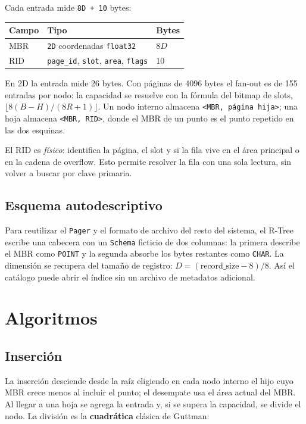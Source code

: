 \documentclass[11pt,a4paper]{article}
\newcommand{\code}[1]{\texttt{#1}}
\begin{document}
Cada entrada mide \code{8D + 10} bytes:

\begin{center}
\begin{tabular}{lll}
\hline
Campo & Tipo & Bytes \\
\hline
MBR & \code{2D} coordenadas \code{float32} & \(8D\) \\
RID & \code{page\_id}, \code{slot}, \code{area}, \code{flags} & 10 \\
\hline
\end{tabular}
\end{center}

En 2D la entrada mide 26 bytes. Con páginas de 4096 bytes el fan-out es de 155
entradas por nodo: la capacidad se resuelve con la fórmula del bitmap de slots,
\(\lfloor 8(B-H)/(8R+1) \rfloor\). Un nodo interno almacena
\code{<MBR, página hija>}; una hoja almacena \code{<MBR, RID>}, donde el MBR de
un punto es el punto repetido en las dos esquinas.

El RID es \emph{físico}: identifica la página, el slot y si la fila vive en el
área principal o en la cadena de overflow. Esto permite resolver la fila con una
sola lectura, sin volver a buscar por clave primaria.

\subsection{Esquema autodescriptivo}

Para reutilizar el \code{Pager} y el formato de archivo del resto del sistema,
el R-Tree escribe una cabecera con un \code{Schema} ficticio de dos columnas:
la primera describe el MBR como \code{POINT} y la segunda absorbe los bytes
restantes como \code{CHAR}. La dimensión se recupera del tamaño de registro:
\(D = (\text{record\_size} - 8) / 8\). Así el catálogo puede abrir el índice sin
un archivo de metadatos adicional.

\section{Algoritmos}

\subsection{Inserción}

La inserción desciende desde la raíz eligiendo en cada nodo interno el hijo cuyo
MBR crece menos al incluir el punto; el desempate usa el área actual del MBR.
Al llegar a una hoja se agrega la entrada y, si se supera la capacidad, se
divide el nodo. La división es la \textbf{cuadrática} clásica de Guttman:
\end{document}
